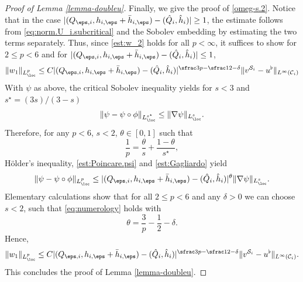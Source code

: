 \begin{proof}[Proof of Lemma \ref{lemma-doubleu}]
Finally, we give the proof of \eqref{omeg-s.2}. Notice that in the case $|(Q_{\eps,i},h_{i,\eps} + \bar h_{i,\eps}) - (\hat Q_i,\hat h_i)| \geq 1$, the estimate follows from \eqref{eq:norm.U_i.subcritical} and the Sobolev embedding by estimating the two terms separately. Thus, since \eqref{est:w_2} holds for all $p < \infty$, it suffices to show for $2 \leq p < 6$ and for $|(Q_{\eps,i},h_{i,\eps} + \bar h_{i,\eps}) - (\hat Q_i,\hat h_i)| \leq 1$,
\begin{equation}
\|w_1\|_{L^p_{\loc}} \leq C |(Q_{\eps,i},h_{i,\eps} + \bar h_{i,\eps}) - (\hat Q_i,\hat h_i)|^{\sfrac 3 p - \sfrac 1 2 - \delta} \| v^{{\mathcal S}_i} - u^\flat\|_{L^\infty(\mathcal C_i)}
\end{equation}
With $\psi$ as above, the critical Sobolev inequality yields for $s < 3$ and $s^\star = (3s)/(3-s)$%
\begin{equation} \label{est:Gagliardo}
\|\psi - \psi \circ \phi\|_{L^{s^\star}_\loc} \leq \|\nabla \psi\|_{L^s_\loc}.
\end{equation}
Therefore,
for any $p < 6$, $s < 2$, $\theta \in [0,1]$ such that
\begin{equation} \label{eq:numerology}
\frac 1 p = \frac \theta s + \frac{1 - \theta} {s^\star},
\end{equation}
Hölder's inequality, \eqref{est:Poincare.psi} and \eqref{est:Gagliardo} yield
\begin{equation}
\|\psi - \psi \circ \phi\|_{L^{p}_\loc} \leq |(Q_{\eps,i},h_{i,\eps} + \bar h_{i,\eps}) - (\hat Q_i,\hat h_i)|^{\theta} \|\nabla \psi\|_{L^s_\loc}.
\end{equation}
Elementary calculations show that for all $2 \leq p<6$ and any $\delta > 0$ we can choose $s < 2$, such that \eqref{eq:numerology} holds with
\begin{equation}
\theta = \frac 3 p - \frac 1 2 - \delta.
\end{equation}
Hence,
\begin{equation} \label{est:w_1.comment}
\|w_1\|_{L^p_{\loc}} \leq C |(Q_{\eps,i},h_{i,\eps} + \bar h_{i,\eps}) - (\hat Q_i,\hat h_i)|^{\sfrac 3 p - \sfrac 1 2 - \delta} \| v^{{\mathcal S}_i} - u^\flat\|_{L^\infty(\mathcal C_i)}.
\end{equation}
This concludes the proof of Lemma \ref{lemma-doubleu}.
\end{proof}


